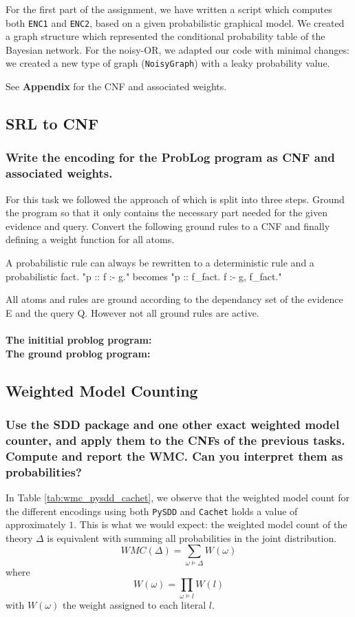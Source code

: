 \documentclass{article}
\begin{document}
For the first part of the assignment, we have written a script which computes both \texttt{ENC1} and \texttt{ENC2}, based on a given probabilistic graphical model. We created a graph structure which represented the conditional probability table of the Bayesian network. For the noisy-OR, we adapted our code with minimal changes: we created a new type of graph (\texttt{NoisyGraph}) with a leaky probability value.

See \textbf{Appendix} for the CNF and associated weights.

\newpage
 
\subsection{SRL to CNF}
\subsubsection{Write the encoding for the ProbLog program as CNF and associated weights.}
For this task we followed the approach of \cite{Fierens} which is split into three steps. Ground the program so that it only contains the necessary part needed for the given evidence and query. Convert the following ground rules to a CNF and finally defining a weight function for all atoms.

A probabilistic rule can always be rewritten to a deterministic rule and a probabilistic fact. "p :: f :- g." becomes "p :: f\_fact. f :- g, f\_fact."

All atoms and rules are ground according to the dependancy set of the evidence E and the query Q. However not all ground rules are active.
\\\\
\textbf{The inititial problog program:}
\\

\textbf{The ground problog program:}
\\


\newpage

\subsection{Weighted Model Counting}

\subsubsection{Use the SDD package and one other exact weighted model counter, and apply them to the CNFs of the previous tasks. Compute and report the WMC. Can you interpret them as probabilities?}
In Table \ref{tab:wmc_pysdd_cachet}, we observe that the weighted model count for the different encodings using both \texttt{PySDD} and \texttt{Cachet} holds a value of approximately $1$. This is what we would expect: the weighted model count of the theory $\Delta$ is equivalent with summing all probabilities in the joint distribution.
$$WMC(\Delta) = \sum_{\omega \models \Delta} W(\omega)$$
where
$$W(\omega) = \prod_{\omega \models l}W(l)$$
with $W(\omega)$ the weight assigned to each literal $l$.\cite{chavira}\\
\end{document}
